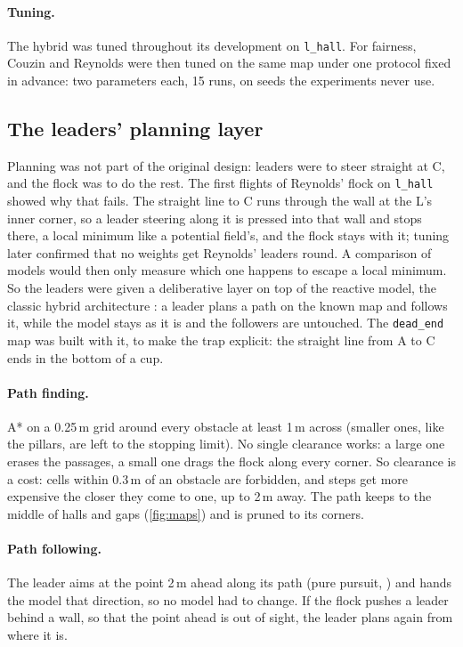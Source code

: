 \paragraph{Tuning.} The hybrid was tuned throughout its development on
\texttt{l\_hall}. For fairness, Couzin and Reynolds were then tuned on the
same map under one protocol fixed in advance: two parameters each, 15 runs,
on seeds the experiments never use.

\subsection{The leaders' planning layer}
\label{sec:planner}

Planning was not part of the original design: leaders were to steer
straight at C, and the flock was to do the rest. The first flights of
Reynolds' flock on \texttt{l\_hall} showed why that fails. The straight
line to C runs through the wall at the L's inner corner, so a leader steering
along it is pressed into that wall and stops there, a local minimum like a
potential field's, and the flock stays with it; tuning later confirmed that no weights get Reynolds' leaders round. A
comparison of models would then only measure which one happens to escape a
local minimum. So the leaders were given a deliberative layer on top of the
reactive model, the classic hybrid architecture \citep{arkin1998}: a leader plans a path
on the known map and follows it, while the model stays as it is and the
followers are untouched. The \texttt{dead\_end} map was built with it, to
make the trap explicit: the straight line from A to C ends in the bottom of
a cup.

\paragraph{Path finding.} A* \citep{hart1968} on a 0.25\,m grid around every obstacle at
least 1\,m across (smaller ones, like the pillars, are left to the stopping
limit). No single clearance works: a large one erases the passages, a small
one drags the flock along every corner. So clearance is a cost: cells within
0.3\,m of an obstacle are forbidden, and steps get more expensive the closer
they come to one, up to 2\,m away. The path keeps to the middle of halls and
gaps (\cref{fig:maps}) and is pruned to its corners.

\paragraph{Path following.} The leader aims at the point 2\,m ahead along its
path (pure pursuit, \citealp{coulter1992}) and hands the model that direction, so no model had to
change. If the flock pushes a leader behind a wall, so that the point ahead
is out of sight, the leader plans again from where it is.

